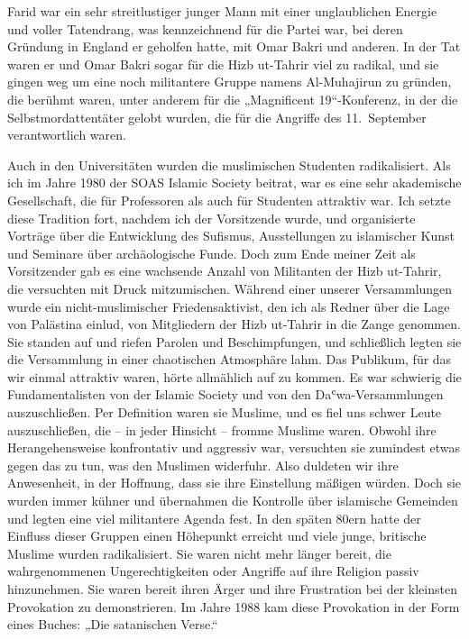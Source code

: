 \documentclass[12pt]{memoir}
\def\`{ʿ} %
\def\–{\hskip0pt-\hskip0pt}
\begin{document}
Farid war ein sehr streitlustiger junger Mann
mit einer unglaublichen Energie und voller Tatendrang,
was kennzeichnend für die Partei war,
bei deren Gründung in England er geholfen hatte,
mit Omar Bakri und anderen.
In der Tat waren er und Omar Bakri
sogar für die Hizb ut\–Tahrir viel zu radikal,
und sie gingen weg um eine noch militantere Gruppe
namens Al\–Muhajirun zu gründen,
die berühmt waren, unter anderem für die „Magnificent 19“\–Konferenz,
in der die Selbstmordattentäter gelobt wurden,
die für die Angriffe des 11.\ September verantwortlich waren.

Auch in den Universitäten wurden die muslimischen Studenten radikalisiert.
Als ich im Jahre 1980 der SOAS Islamic Society beitrat,
war es eine sehr akademische Gesellschaft,
die für Professoren als auch für Studenten attraktiv war.
Ich setzte diese Tradition fort, nachdem ich der Vorsitzende wurde,
und organisierte Vorträge über die Entwicklung des Sufismus,
Ausstellungen zu islamischer Kunst und Seminare über archäologische Funde.
Doch zum Ende meiner Zeit als Vorsitzender gab es eine wachsende Anzahl
von Militanten der Hizb ut\–Tahrir, die versuchten mit Druck mitzumischen.
Während einer unserer Versammlungen wurde
ein nicht\–muslimischer Friedensaktivist,
den ich als Redner über die Lage von Palästina einlud,
von Mitgliedern der Hizb ut\–Tahrir in die Zange genommen.
Sie standen auf und riefen Parolen und Beschimpfungen,
und schließlich legten sie die Versammlung
in einer chaotischen Atmosphäre lahm.
Das Publikum, für das wir einmal attraktiv waren,
hörte allmählich auf zu kommen.
Es war schwierig die Fundamentalisten von der Islamic Society
und von den Da\`wa\–Versammlungen auszuschließen.
Per Definition waren sie Muslime,
und es fiel uns schwer Leute auszuschließen,
die – in jeder Hinsicht – fromme Muslime waren.
Obwohl ihre Herangehensweise konfrontativ und aggressiv war,
versuchten sie zumindest etwas gegen das zu tun, was den Muslimen widerfuhr.
Also duldeten wir ihre Anwesenheit, in der Hoffnung,
dass sie ihre Einstellung mäßigen würden.
Doch sie wurden immer kühner
und übernahmen die Kontrolle über islamische Gemeinden
und legten eine viel militantere Agenda fest.
In den späten 80ern hatte der Einfluss dieser Gruppen einen Höhepunkt erreicht
und viele junge, britische Muslime wurden radikalisiert.
Sie waren nicht mehr länger bereit,
die wahrgenommenen Ungerechtigkeiten oder Angriffe auf ihre Religion
passiv hinzunehmen.
Sie waren bereit ihren Ärger und ihre Frustration
bei der kleinsten Provokation zu demonstrieren.
Im Jahre 1988 kam diese Provokation in der Form eines Buches:
„Die satanischen Verse.“
\end{document}
